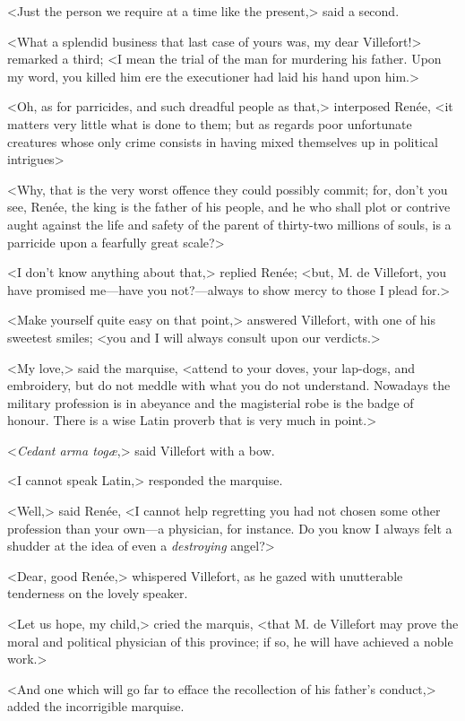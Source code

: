  <Just the person we require at a time like the present,> said a second. 

 <What a splendid business that last case of yours was, my dear Villefort!> remarked a third; <I mean the trial of the man for murdering his father. Upon my word, you killed him ere the executioner had laid his hand upon him.> 

 <Oh, as for parricides, and such dreadful people as that,> interposed Renée, <it matters very little what is done to them; but as regards poor unfortunate creatures whose only crime consists in having mixed themselves up in political intrigues\longdash> 

 <Why, that is the very worst offence they could possibly commit; for, don't you see, Renée, the king is the father of his people, and he who shall plot or contrive aught against the life and safety of the parent of thirty-two millions of souls, is a parricide upon a fearfully great scale?> 

 <I don't know anything about that,> replied Renée; <but, M. de Villefort, you have promised me—have you not?—always to show mercy to those I plead for.> 

 <Make yourself quite easy on that point,> answered Villefort, with one of his sweetest smiles; <you and I will always consult upon our verdicts.> 

 <My love,> said the marquise, <attend to your doves, your lap-dogs, and embroidery, but do not meddle with what you do not understand. Nowadays the military profession is in abeyance and the magisterial robe is the badge of honour. There is a wise Latin proverb that is very much in point.> 

 <\textit{Cedant arma togæ},> said Villefort with a bow. 

 <I cannot speak Latin,> responded the marquise. 

 <Well,> said Renée, <I cannot help regretting you had not chosen some other profession than your own—a physician, for instance. Do you know I always felt a shudder at the idea of even a \textit{destroying} angel?> 

 <Dear, good Renée,> whispered Villefort, as he gazed with unutterable tenderness on the lovely speaker. 

 <Let us hope, my child,> cried the marquis, <that M. de Villefort may prove the moral and political physician of this province; if so, he will have achieved a noble work.> 

 <And one which will go far to efface the recollection of his father's conduct,> added the incorrigible marquise. 


